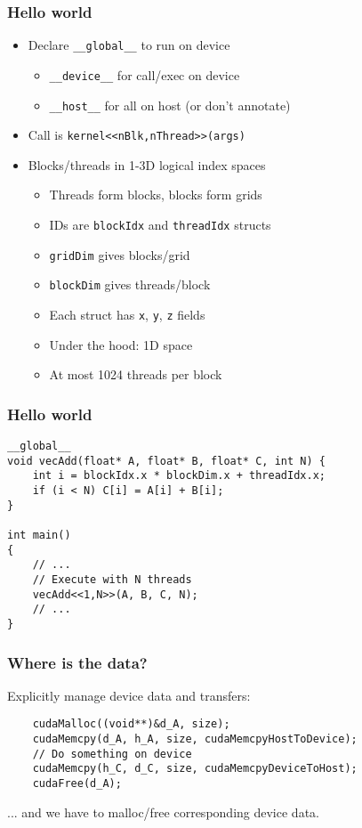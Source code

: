 \documentclass{beamer}
\begin{document}
\begin{frame}
  \frametitle{Hello world}

  \begin{itemize}
  \item Declare {\tt \_\_global\_\_} to run on device
    \begin{itemize}
    \item {\tt \_\_device\_\_} for call/exec on device
    \item {\tt \_\_host\_\_} for all on host (or don't annotate)
    \end{itemize}
  \item Call is {\tt kernel<<nBlk,nThread>>(args)}
  \item Blocks/threads in 1-3D logical index spaces
    \begin{itemize}
    \item Threads form blocks, blocks form grids
    \item IDs are {\tt blockIdx} and {\tt threadIdx} structs
    \item {\tt gridDim} gives blocks/grid
    \item {\tt blockDim} gives threads/block
    \item Each struct has {\tt x}, {\tt y}, {\tt z} fields
    \item Under the hood: 1D space
    \item At most 1024 threads per block
    \end{itemize}
  \end{itemize}
\end{frame}



\begin{frame}[fragile]
  \frametitle{Hello world}

\begin{lstlisting}
__global__ 
void vecAdd(float* A, float* B, float* C, int N) {
    int i = blockIdx.x * blockDim.x + threadIdx.x;
    if (i < N) C[i] = A[i] + B[i];
}

int main()
{
    // ...
    // Execute with N threads
    vecAdd<<1,N>>(A, B, C, N);
    // ...
}
\end{lstlisting}
\end{frame}


\begin{frame}[fragile]
  \frametitle{Where is the data?}

  Explicitly manage device data and transfers:
\begin{lstlisting}
    cudaMalloc((void**)&d_A, size);
    cudaMemcpy(d_A, h_A, size, cudaMemcpyHostToDevice);
    // Do something on device
    cudaMemcpy(h_C, d_C, size, cudaMemcpyDeviceToHost);
    cudaFree(d_A);
\end{lstlisting}
  ... and we have to malloc/free corresponding device data.
\end{frame}
\end{document}
